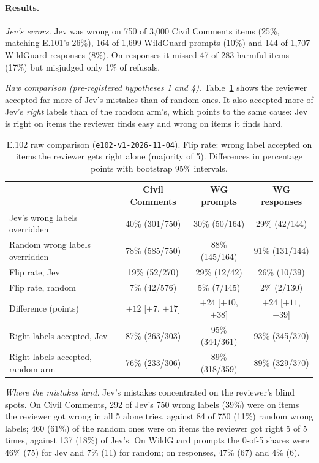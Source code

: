 \documentclass[11pt]{article}
\renewcommand{\_}{\origunderscore\allowbreak}
\begin{document}
\paragraph{Results.}
\emph{Jev's errors.} Jev was wrong on 750 of 3,000 Civil Comments items (25\%, matching E.101's 26\%), 164 of 1,699 WildGuard prompts (10\%) and 144 of 1,707 WildGuard responses (8\%). On responses it missed 47 of 283 harmful items (17\%) but misjudged only 1\% of refusals.

\emph{Raw comparison (pre-registered hypotheses 1 and 4).} Table~\ref{tab:e102-raw} shows the reviewer accepted far more of Jev's mistakes than of random ones. It also accepted more of Jev's \emph{right} labels than of the random arm's, which points to the same cause: Jev is right on items the reviewer finds easy and wrong on items it finds hard.

\begin{table}[H]
\centering
\small
\caption{E.102 raw comparison (\texttt{e102-v1-2026-11-04}). Flip rate: wrong label accepted on items the reviewer gets right alone (majority of 5). Differences in percentage points with bootstrap 95\% intervals.}
\label{tab:e102-raw}
\begin{tabular}{lccc}
\toprule
 & Civil Comments & WG prompts & WG responses \\
\midrule
Jev's wrong labels overridden & 40\% (301/750) & 30\% (50/164) & 29\% (42/144) \\
Random wrong labels overridden & 78\% (585/750) & 88\% (145/164) & 91\% (131/144) \\
Flip rate, Jev & 19\% (52/270) & 29\% (12/42) & 26\% (10/39) \\
Flip rate, random & 7\% (42/576) & 5\% (7/145) & 2\% (2/130) \\
Difference (points) & $+12$ [$+7$, $+17$] & $+24$ [$+10$, $+38$] & $+24$ [$+11$, $+39$] \\
Right labels accepted, Jev & 87\% (263/303) & 95\% (344/361) & 93\% (345/370) \\
Right labels accepted, random arm & 76\% (233/306) & 89\% (318/359) & 89\% (329/370) \\
\bottomrule
\end{tabular}
\end{table}

\emph{Where the mistakes land.} Jev's mistakes concentrated on the reviewer's blind spots. On Civil Comments, 292 of Jev's 750 wrong labels (39\%) were on items the reviewer got wrong in all 5 alone tries, against 84 of 750 (11\%) random wrong labels; 460 (61\%) of the random ones were on items the reviewer got right 5 of 5 times, against 137 (18\%) of Jev's. On WildGuard prompts the 0-of-5 shares were 46\% (75) for Jev and 7\% (11) for random; on responses, 47\% (67) and 4\% (6).
\end{document}
